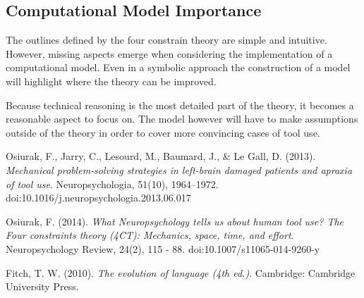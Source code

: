 \documentclass[11]{article}
\begin{document}
\subsection*{Computational Model Importance}
The outlines defined by the four constrain theory are simple and intuitive. However, missing aspects emerge when considering the implementation of a computational model. Even in a symbolic approach the construction of a model will highlight where the theory can be improved. 

Because technical reasoning is the most detailed part of the theory, it becomes a reasonable aspect to focus on. The model however will have to make assumptions outside of the theory in order to cover more convincing cases of tool use. 

\begin{thebibliography}{9}
Osiurak, F., Jarry, C., Lesourd, M., Baumard, J., \& Le Gall, D. (2013). \emph{Mechanical problem-solving strategies in left-brain damaged patients and apraxia of tool use}. Neuropsychologia, 51(10), 1964–1972.
doi:10.1016/j.neuropsychologia.2013.06.017

Osiurak, F. (2014). \emph{What Neuropsychology tells us about human tool use? The Four constraints theory (4CT): Mechanics, space, time, and effort}. Neuropsychology Review, 24(2), 115 - 88. doi:10.1007/s11065-014-9260-y


Fitch, T. W. (2010). \emph{The evolution of language (4th ed.)}. Cambridge: Cambridge University Press.



\end{thebibliography}
\end{document}
